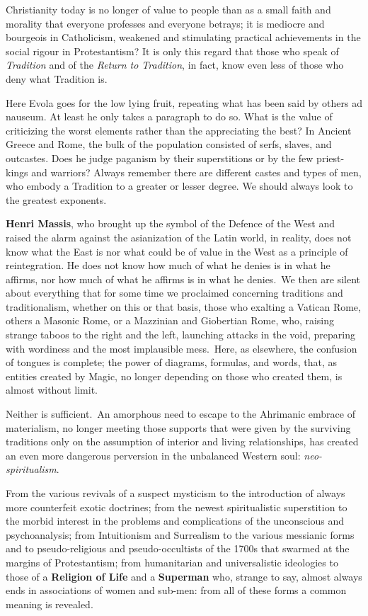 Christianity today is no longer of value to people than as a small faith and morality that everyone professes and everyone betrays; it is mediocre and bourgeois in Catholicism, weakened and stimulating practical achievements in the social rigour in Protestantism? It is only this regard that those who speak of \emph{Tradition} and of the \emph{Return to Tradition}, in fact, know even less of those who deny what Tradition is.

\begin{quotex}
Here Evola goes for the low lying fruit, repeating what has been said by others ad nauseum. At least he only takes a paragraph to do so. What is the value of criticizing the worst elements rather than the appreciating the best? In Ancient Greece and Rome, the bulk of the population consisted of serfs, slaves, and outcastes. Does he judge paganism by their superstitions or by the few priest-kings and warriors? Always remember there are different castes and types of men, who embody a Tradition to a greater or lesser degree. We should always look to the greatest exponents.

\end{quotex}
\textbf{Henri Massis}, who brought up the symbol of the Defence of the West and raised the alarm against the asianization of the Latin world, in reality, does not know what the East is nor what could be of value in the West as a principle of reintegration. He does not know how much of what he denies is in what he affirms, nor how much of what he affirms is in what he denies. We then are silent about everything that for some time we proclaimed concerning traditions and traditionalism, whether on this or that basis, those who exalting a Vatican Rome, others a Masonic Rome, or a Mazzinian and Giobertian Rome, who, raising strange taboos to the right and the left, launching attacks in the void, preparing with wordiness and the most implausible mess. Here, as elsewhere, the confusion of tongues is complete; the power of diagrams, formulas, and words, that, as entities created by Magic, no longer depending on those who created them, is almost without limit. 

Neither is sufficient. An amorphous need to escape to the Ahrimanic embrace of materialism, no longer meeting those supports that were given by the surviving traditions only on the assumption of interior and living relationships, has created an even more dangerous perversion in the unbalanced Western soul: \emph{neo-spiritualism}. 

From the various revivals of a suspect mysticism to the introduction of always more counterfeit exotic doctrines; from the newest spiritualistic superstition to the morbid interest in the problems and complications of the unconscious and psychoanalysis; from Intuitionism and Surrealism to the various messianic forms and to pseudo-religious and pseudo-occultists of the 1700s that swarmed at the margins of Protestantism; from humanitarian and universalistic ideologies to those of a \textbf{Religion of Life} and a \textbf{Superman} who, strange to say, almost always ends in associations of women and sub-men: from all of these forms a common meaning is revealed. 

